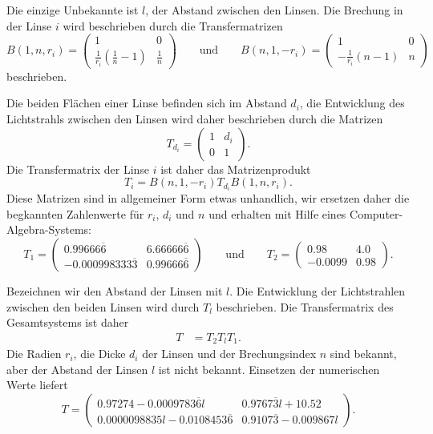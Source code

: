 \begin{loesung}
Die einzige Unbekannte ist $l$, der Abstand zwischen den Linsen.
Die Brechung in der Linse $i$ wird beschrieben durch die Transfermatrizen
\[
B(1,n,r_i)
=
\begin{pmatrix}
1 & 0 \\
\frac1{r_i}(\frac{1}{n}-1) & \frac1{n}
\end{pmatrix}
\qquad\text{und}\qquad
B(n,1,-r_i)
=
\begin{pmatrix}
1&0\\
-\frac1{r_i}(n-1) & n
\end{pmatrix}
\]
beschrieben.

Die beiden Flächen einer Linse befinden sich im Abstand $d_i$, die
Entwicklung des Lichtstrahls zwischen den Linsen wird daher beschrieben
durch die Matrizen
\[
T_{d_i} = \begin{pmatrix} 1&d_i\\0&1\end{pmatrix}.
\]
Die Transfermatrix der Linse $i$ ist daher das Matrizenprodukt
\begin{equation}
T_i
=
B(n,1,-r_i)
T_{d_i}
B(1,n,r_i).
\label{10000059:linse}
\end{equation}
Diese Matrizen sind in allgemeiner Form etwas unhandlich, wir ersetzen
daher die begkannten Zahlenwerte für $r_i$, $d_i$ und $n$ und erhalten
mit Hilfe eines Computer-Algebra-Systems:
\begin{equation}
T_1
=
\begin{pmatrix}
  0.99666\overline{6}& 6.66666\overline{6}  \\
- 0.000998333\overline{3} & 0.99666\overline{6}
\end{pmatrix}
\qquad\text{und}\qquad
T_2
=
\begin{pmatrix}
 0.98 & 4.0 \\
-0.0099 & 0.98
\end{pmatrix}.
\label{10000059:linsen}
\end{equation}

Bezeichnen wir den Abstand der Linsen mit $l$.
Die Entwicklung der Lichtstrahlen zwischen den beiden Linsen wird
durch $T_l$ beschrieben.
Die Transfermatrix des Gesamtsystems ist daher
\begin{align*}
T
&=
T_2 T_l T_1.
\end{align*}
Die Radien $r_i$, die Dicke $d_i$ der Linsen und der Brechungsindex $n$
sind bekannt, aber der Abstand der Linsen $l$ ist nicht bekannt.
Einsetzen der numerischen Werte liefert 
\begin{equation}
T
=
\begin{pmatrix}
0.97274 - 0.0009783\overline{6} l      & 0.9767\overline{3} l + 10.52 \\
0.0000098835 l - 0.0108453\overline{6} & 0.9107\overline{3} - 0.009867 l
\end{pmatrix}.
\label{10000059:gesamt}
\end{equation}



\end{loesung}
